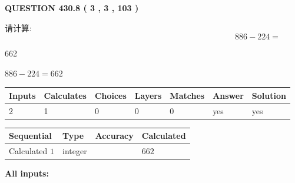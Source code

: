 \documentclass{ctexart}
\begin{document}
{\textbf{\Large{QUESTION
430.8 
 ( 3 , 3 , 103 )
}}}
  
  
 
请计算:
\begin{equation}
886 -   %
224 = \nonumber
\end{equation}
 
 
 
\noindent{}
 
 

662
 
 
\noindent{}
 
 

 
 
 
\noindent{}
 
 

$ %
886 -  %
224=   %
662$
 
 
\noindent{}
 
 

 
   
   
   
   
\noindent\begin{tabular}{|l|l|l|l|l|l|l|}
 \hline
Inputs & Calculates & Choices & Layers & Matches & Answer & Solution \\ \hline
 2  & 
 1  & 
 0
  & 
 0  & 
 0  & 
  yes & 
  yes 
  \\ \hline
 \end{tabular}
   
   
   
   
\noindent{}
   
   
  
  
\noindent\begin{tabular}{|l|l|l|l|}
\hline
 Sequential & Type & Accuracy & Calculated \\ 
\hline
 
 
  Calculated $  1 $ & integer &  & 
  $ 662 $ 
 \\  \hline  
 \end{tabular}
   
   
   
   
\noindent\vspace{0.1in}\hspace{-0.08in} {\textbf{\Large{All inputs: }}}
   
\end{document}
